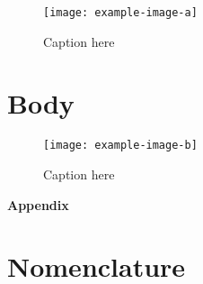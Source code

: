 \documentclass{goose-article}
\begin{document}
\begin{figure}[htp]
    \centering
    \texttt{[image: example-image-a]}
    \caption{Caption here}
    \label{fig:a}
\end{figure}

\section{Body}

\lipsum[7-12]

\begin{figure}[htp]
    \centering
    \texttt{[image: example-image-b]}
    \caption{Caption here}
    \label{fig:b}
\end{figure}




\onecolumn
\justify
\appendix

\begin{center}
    \Large\textbf{Appendix}
\end{center}

\section{Nomenclature}

\lipsum[11-15]
\end{document}
